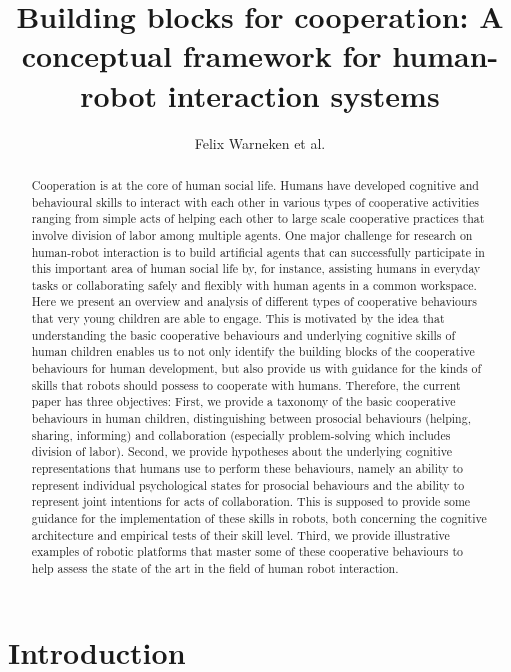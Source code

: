 \documentclass{article}
\title{Building blocks for cooperation: A conceptual framework for human-robot interaction systems}
\author{Felix Warneken et al.}
\begin{document}
\maketitle
\tableofcontents

\begin{abstract}

Cooperation is at the core of human social life. Humans have developed
cognitive and behavioural skills to interact with each other in various types of
cooperative activities ranging from simple acts of helping each other to large
scale cooperative practices that involve division of labor among multiple
agents. One major challenge for research on human-robot interaction is to build
artificial agents that can successfully participate in this important area of
human social life by, for instance, assisting humans in everyday tasks or
collaborating safely and flexibly with human agents in a common workspace. Here
we present an overview and analysis of different types of cooperative behaviours
that very young children are able to engage. This is motivated by the idea that
understanding the basic cooperative behaviours and underlying cognitive skills
of human children enables us to not only identify the building blocks of the
cooperative behaviours for human development, but also provide us with guidance
for the kinds of skills that robots should possess to cooperate with humans.
Therefore, the current paper has three objectives: First, we provide a
taxonomy of the basic cooperative behaviours in human children,
distinguishing between prosocial behaviours (helping, sharing, informing)
and collaboration (especially problem-solving which includes division of
labor). Second, we provide hypotheses about the underlying cognitive
representations that humans use to perform these behaviours, namely an
ability to represent individual psychological states for prosocial
behaviours and the ability to represent joint intentions for acts of
collaboration. This is supposed to provide some guidance for the
implementation of these skills in robots, both concerning the cognitive
architecture and empirical tests of their skill level. Third, we provide
illustrative examples of robotic platforms that master some of these
cooperative behaviours to help assess the state of the art in the field of
human robot interaction.

\end{abstract}

\section{Introduction}
\end{document}
